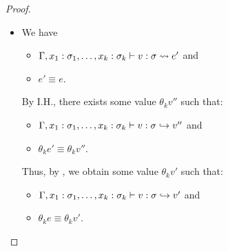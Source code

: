 \begin{proof}
\begin{itemize}
\item[] 
We have
\begin{itemize}
\item \(\Gamma,x_1:\sigma_1,\dots,x_k:\sigma_k \vdash v : \sigma \leadsto e'\) and
\item \(e' \equiv e\).
\end{itemize}
%
By I.H., there exists some value \(\theta_k v''\) such that:
\begin{itemize}
\item \(\Gamma,x_1:\sigma_1,\dots,x_k:\sigma_k \vdash v : \sigma \hookrightarrow v''\) and
\item \(\theta_k e' \equiv \theta_k v''\).
\end{itemize}
Thus, by , we obtain some value \(\theta_k v'\) such that:
\begin{itemize}
\item \(\Gamma,x_1:\sigma_1,\dots,x_k:\sigma_k \vdash v : \sigma \hookrightarrow v'\) and
\item \(\theta_k e \equiv \theta_k v'\).
\end{itemize}

\end{itemize}
\end{proof}

